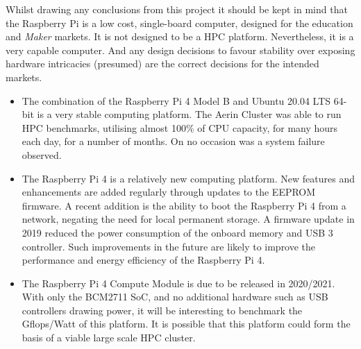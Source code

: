 Whilst drawing any conclusions from this project it should be kept in mind that the Raspberry Pi is a low cost, single-board computer, designed for the education and \emph{Maker} markets. It is not designed to be a HPC platform. Nevertheless, it is a very capable computer. And any design decisions to favour stability over exposing hardware intricacies (presumed) are the correct decisions for the intended markets.

\begin{itemize}
\item The combination of the Raspberry Pi 4 Model B and Ubuntu 20.04 LTS 64-bit is a very stable computing platform. The Aerin Cluster was able to run HPC benchmarks, utilising almost 100\% of CPU capacity, for many hours each day, for a number of months. On no occasion was a system failure observed.

\item The Raspberry Pi 4 is a relatively new computing platform. New features and enhancements are added regularly through updates to the EEPROM firmware. A recent addition is the ability to boot the Raspberry Pi 4 from a network, negating the need for local permanent storage. A firmware update in 2019 reduced the power consumption of the onboard memory and USB 3 controller. Such improvements in the future are likely to improve the performance and energy efficiency of the Raspberry Pi 4.

\item The Raspberry Pi 4 Compute Module is due to be released in 2020/2021. With only the BCM2711 SoC, and no additional hardware such as USB controllers drawing power, it will be interesting to benchmark the Gflops/Watt of this platform. It is possible that this platform could form the basis of a viable large scale HPC cluster.
\end{itemize}

